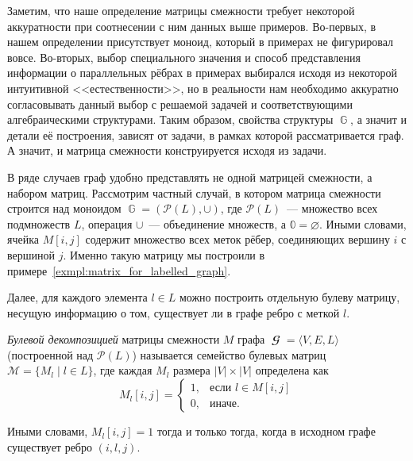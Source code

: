 Заметим, что наше определение матрицы смежности требует некоторой аккуратности при соотнесении с ним данных выше примеров.
Во-первых, в нашем определении присутствует моноид, который в примерах не фигурировал вовсе.
Во-вторых, выбор специального значения и способ представления информации о параллельных рёбрах в примерах выбирался исходя из некоторой интуитивной <<естественности>>, но в реальности нам необходимо аккуратно согласовывать данный выбор с решаемой задачей и соответствующими алгебраическими структурами.
Таким образом, свойства структуры $\BbbG$, а значит и детали её построения, зависят от задачи, в рамках которой рассматривается граф.
А значит, и матрица смежности конструируется исходя из задачи.

В ряде случаев граф удобно представлять не одной матрицей смежности, а набором матриц.
Рассмотрим частный случай, в котором матрица смежности строится над моноидом $\BbbG = (\mathcal{P}(L), \cup)$, где $\mathcal{P}(L)$~--- множество всех подмножеств $L$, операция $\cup$~--- объединение множеств, а $\Bbbzero = \varnothing$.
Иными словами, ячейка $M[i,j]$ содержит множество всех меток рёбер, соединяющих вершину $i$ с вершиной $j$.
Именно такую матрицу мы построили в примере~\ref{exmpl:matrix_for_labelled_graph}.

Далее, для каждого элемента $l \in L$ можно построить отдельную булеву матрицу, несущую информацию о том, существует ли в графе ребро с меткой $l$.

\begin{definition}
    \label{def:BoolDecomposition}
    \emph{Булевой декомпозицией} матрицы смежности $M$ графа $\mbfscrG = \langle V, E, L \rangle$ (построенной над $\mathcal{P}(L)$) называется семейство булевых матриц $\mathcal{M} = \{M_l \mid l \in L \}$, где каждая $M_l$ размера $|V| \times |V|$ определена как
    \[ M_l[i,j] = \begin{cases}
        1, & \text{если } l \in M[i,j] \\
        0, & \text{иначе}.
    \end{cases} \]
\end{definition}

Иными словами, $M_l[i,j] = 1$ тогда и только тогда, когда в исходном графе существует ребро $(i,l,j)$.

